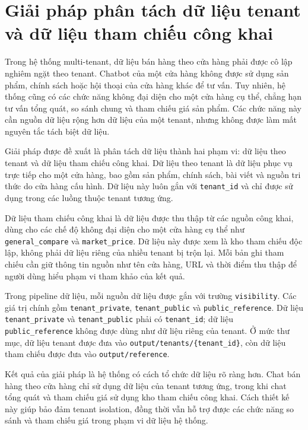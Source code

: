 \documentclass[../DoAn.tex]{subfiles}
\begin{document}
\section{Giải pháp phân tách dữ liệu tenant và dữ liệu tham chiếu công khai}
\label{section:5.2}

Trong hệ thống multi-tenant, dữ liệu bán hàng theo cửa hàng phải được cô lập nghiêm ngặt theo tenant. Chatbot của một cửa hàng không được sử dụng sản phẩm, chính sách hoặc hội thoại của cửa hàng khác để tư vấn. Tuy nhiên, hệ thống cũng có các chức năng không đại diện cho một cửa hàng cụ thể, chẳng hạn tư vấn tổng quát, so sánh chung và tham chiếu giá sản phẩm. Các chức năng này cần nguồn dữ liệu rộng hơn dữ liệu của một tenant, nhưng không được làm mất nguyên tắc tách biệt dữ liệu.

Giải pháp được đề xuất là phân tách dữ liệu thành hai phạm vi: dữ liệu theo tenant và dữ liệu tham chiếu công khai. Dữ liệu theo tenant là dữ liệu phục vụ trực tiếp cho một cửa hàng, bao gồm sản phẩm, chính sách, bài viết và nguồn tri thức do cửa hàng cấu hình. Dữ liệu này luôn gắn với \texttt{tenant\_id} và chỉ được sử dụng trong các luồng thuộc tenant tương ứng.

Dữ liệu tham chiếu công khai là dữ liệu được thu thập từ các nguồn công khai, dùng cho các chế độ không đại diện cho một cửa hàng cụ thể như \texttt{general\_compare} và \texttt{market\_price}. Dữ liệu này được xem là kho tham chiếu độc lập, không phải dữ liệu riêng của nhiều tenant bị trộn lại. Mỗi bản ghi tham chiếu cần giữ thông tin nguồn như tên cửa hàng, URL và thời điểm thu thập để người dùng hiểu phạm vi tham khảo của kết quả.

Trong pipeline dữ liệu, mỗi nguồn dữ liệu được gắn với trường \texttt{visibility}. Các giá trị chính gồm \texttt{tenant\_private}, \texttt{tenant\_public} và \texttt{public\_reference}. Dữ liệu \texttt{tenant\_private} và \texttt{tenant\_public} phải có \texttt{tenant\_id}; dữ liệu \texttt{public\_reference} không được dùng như dữ liệu riêng của tenant. Ở mức thư mục, dữ liệu tenant được đưa vào \texttt{output/tenants/\{tenant\_id\}}, còn dữ liệu tham chiếu được đưa vào \texttt{output/reference}.

Kết quả của giải pháp là hệ thống có cách tổ chức dữ liệu rõ ràng hơn. Chat bán hàng theo cửa hàng chỉ sử dụng dữ liệu của tenant tương ứng, trong khi chat tổng quát và tham chiếu giá sử dụng kho tham chiếu công khai. Cách thiết kế này giúp bảo đảm tenant isolation, đồng thời vẫn hỗ trợ được các chức năng so sánh và tham chiếu giá trong phạm vi dữ liệu hệ thống.
\end{document}
